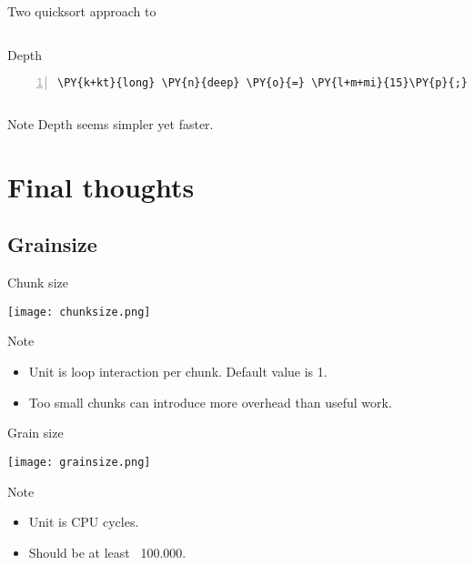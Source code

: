 \documentclass{beamer}
\begin{document}
\begin{frame}[fragile]{Two quicksort approach to }
\begin{columns}[t]
\begin{block}{Depth}
\begin{Verbatim}[commandchars=\\\{\},numbers=left,firstnumber=1,stepnumber=1]
\PY{k+kt}{long} \PY{n}{deep} \PY{o}{=} \PY{l+m+mi}{15}\PY{p}{;}
\end{Verbatim}
\end{block}


\end{columns}

\begin{exampleblock}{Note}
\small
Depth seems simpler yet faster.
\end{exampleblock}

\end{frame}


\section{Final thoughts}



\subsection{Grainsize}


\begin{frame}[fragile]{Chunk size}

\begin{center}
\texttt{[image: chunksize.png]}  
\end{center}

\begin{exampleblock}{Note}
\small
\begin{itemize}
 \item Unit is loop interaction per chunk. Default value is 1.
 \item Too small chunks can introduce more overhead than useful work.
\end{itemize}
\end{exampleblock}

\end{frame}


\begin{frame}[fragile]{Grain size}

\begin{center}
\texttt{[image: grainsize.png]}  
\end{center}

\begin{exampleblock}{Note}
\small
\begin{itemize}
 \item Unit is CPU cycles.
 \item Should be at least ~100.000.
\end{itemize}
\end{exampleblock}

\end{frame}
\end{document}
